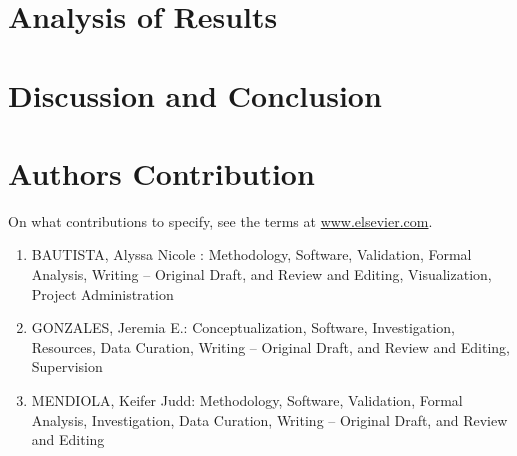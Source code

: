 \section{Analysis of Results}
\label{sec:results}


\section{Discussion and Conclusion}
\label{sec:conc}


\section{Authors Contribution}
On what contributions to specify, see the terms at \url{www.elsevier.com}.
\begin{enumerate}
    \item BAUTISTA, Alyssa Nicole : Methodology, Software, Validation, Formal Analysis, Writing – Original Draft, and Review and Editing, Visualization, Project Administration
    \item GONZALES, Jeremia E.: Conceptualization, Software, Investigation, Resources, Data Curation, Writing – Original Draft, and Review and Editing, Supervision
    \item MENDIOLA, Keifer Judd: Methodology, Software, Validation, Formal Analysis, Investigation, Data Curation, Writing – Original Draft, and Review and Editing
\end{enumerate}




%


% 

